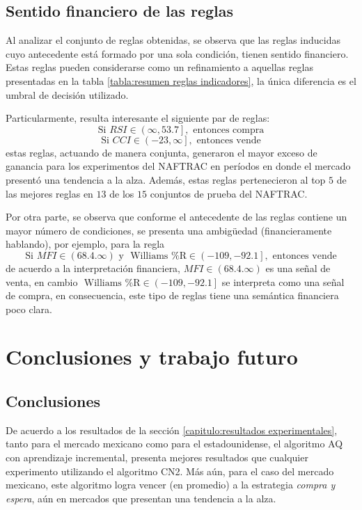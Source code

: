 \documentclass[12pt]{report}
\theoremstyle{break}
\theoremstyle{break}
\begin{document}
\section{Sentido financiero de las reglas}
\label{seccion:sentido financiero de las reglas}
Al analizar el conjunto de reglas obtenidas, se observa que las reglas inducidas cuyo antecedente está formado por una sola condición, tienen sentido financiero. Estas reglas pueden considerarse como un refinamiento a aquellas reglas presentadas en la tabla \ref{tabla:resumen reglas indicadores}, la única diferencia es el umbral de decisión utilizado. 

Particularmente, resulta interesante el siguiente par de reglas:
$$
\mbox{Si } RSI \in \left(\infty, 53.7\right], \mbox{ entonces compra}
$$
$$
\mbox{Si } CCI \in \left(-23, \infty \right], \mbox{ entonces vende}
$$
estas reglas, actuando de manera conjunta, generaron el mayor exceso de ganancia para los experimentos del NAFTRAC en períodos en donde el mercado presentó una tendencia a la alza. Además, estas reglas pertenecieron al top $5$ de las mejores reglas en $13$ de los $15$ conjuntos de prueba del NAFTRAC.

Por otra parte, se observa que conforme el antecedente de las reglas contiene un mayor número de condiciones, se presenta una ambigüedad (financieramente hablando), por ejemplo, para la regla
$$
\mbox{Si } MFI \in \left(68.4. \infty\right) \mbox{ y } \mbox{ Williams \%R} \in \left(-109, -92.1 \right], \mbox{ entonces vende}
$$
de acuerdo a la interpretación financiera, $MFI \in \left(68.4. \infty\right)$ es una señal de venta, en cambio $\mbox{ Williams \%R} \in \left(-109, -92.1 \right]$ se interpreta como una señal de compra, en consecuencia, este tipo de reglas tiene una semántica financiera poco clara.

\chapter[Capítulo \thechapter: Conclusiones y trabajo futuro]{Conclusiones y trabajo futuro}
\label{capitulo:conclusiones}
\section{Conclusiones}
\label{seccion:conclusiones}
De acuerdo a los resultados de la sección \ref{capitulo:resultados experimentales}, tanto para el mercado mexicano como para el estadounidense, el algoritmo AQ con aprendizaje incremental, presenta mejores resultados que cualquier experimento utilizando el algoritmo CN2. Más aún, para el caso del mercado mexicano, este algoritmo logra vencer (en promedio) a la estrategia \textit{compra y espera}, aún en mercados que presentan una tendencia a la alza. 
\end{document}
